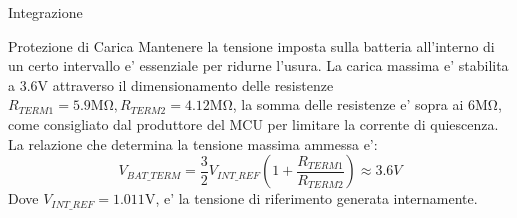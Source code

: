 \begin{section}{Integrazione}
    \begin{subsection}{Protezione di Carica}
        Mantenere la tensione imposta sulla batteria all'interno di un certo intervallo e' essenziale per ridurne l'usura. La carica massima e' stabilita a \(3.6\mathrm{V}\) attraverso il dimensionamento delle resistenze \(R_{TERM1}=5.9\mathrm{M\Omega},R_{TERM2}=4.12\mathrm{M\Omega}\), la somma delle resistenze e' sopra ai \(6\mathrm{M\Omega}\), come consigliato dal produttore del MCU per limitare la corrente di quiescenza. La relazione che determina la tensione massima ammessa e':
        \begin{equation*}
            V_{BAT\_TERM} = \frac{3}{2}V_{INT\_REF}\left(1+\frac{R_{TERM1}}{R_{TERM2}}\right) \approx 3.6V
        \end{equation*}
        Dove \(V_{INT\_REF}=1.011\mathrm{V}\), e' la tensione di riferimento generata internamente.
    \end{subsection}


\end{section}
